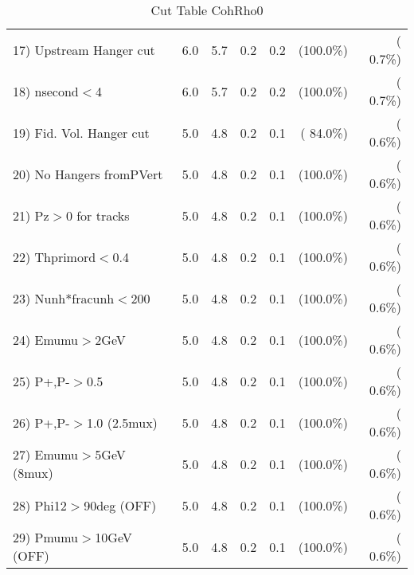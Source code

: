 \begin{table}[h!]
\begin{tabular}{||l||r|r|r|r|r|r||}
 17) Upstream Hanger cut  &          6.0 &          5.7 &          0.2 &          0.2 & (100.0\%) & (  0.7\%) \\
 18) nsecond$<$4          &          6.0 &          5.7 &          0.2 &          0.2 & (100.0\%) & (  0.7\%) \\
 19) Fid. Vol. Hanger cut &          5.0 &          4.8 &          0.2 &          0.1 & ( 84.0\%) & (  0.6\%) \\
 20) No Hangers fromPVert &          5.0 &          4.8 &          0.2 &          0.1 & (100.0\%) & (  0.6\%) \\
 21) Pz$>$0 for tracks    &          5.0 &          4.8 &          0.2 &          0.1 & (100.0\%) & (  0.6\%) \\
 22) Thprimord$<$0.4      &          5.0 &          4.8 &          0.2 &          0.1 & (100.0\%) & (  0.6\%) \\
 23) Nunh*fracunh$<$200   &          5.0 &          4.8 &          0.2 &          0.1 & (100.0\%) & (  0.6\%) \\
 24) Emumu$>$2GeV         &          5.0 &          4.8 &          0.2 &          0.1 & (100.0\%) & (  0.6\%) \\
 25) P+,P-$>$0.5          &          5.0 &          4.8 &          0.2 &          0.1 & (100.0\%) & (  0.6\%) \\
 26) P+,P-$>$1.0 (2.5mux) &          5.0 &          4.8 &          0.2 &          0.1 & (100.0\%) & (  0.6\%) \\
 27) Emumu$>$5GeV  (8mux) &          5.0 &          4.8 &          0.2 &          0.1 & (100.0\%) & (  0.6\%) \\
 28) Phi12$>$90deg  (OFF) &          5.0 &          4.8 &          0.2 &          0.1 & (100.0\%) & (  0.6\%) \\
 29) Pmumu$>$10GeV  (OFF) &          5.0 &          4.8 &          0.2 &          0.1 & (100.0\%) & (  0.6\%) \\
 \hline
 \hline
 \end{tabular}
 \caption{Cut Table  CohRho0  }
 \label{tab-cutcohjpsi-mumu_cohrho0}
 \end{table}
